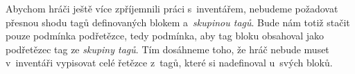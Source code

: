 Abychom hráči ještě více zpříjemnili práci s~inventářem, nebudeme požadovat přesnou shodu tagů definovaných blokem a~\textit{skupinou tagů}. Bude nám totiž stačit pouze podmínka podřetězce, tedy podmínka, aby tag bloku obsahoval jako podřetězec tag ze \textit{skupiny tagů}. Tím dosáhneme toho, že hráč nebude muset v~inventáři vypisovat celé řetězce z~tagů, které si nadefinoval u~svých bloků. 



